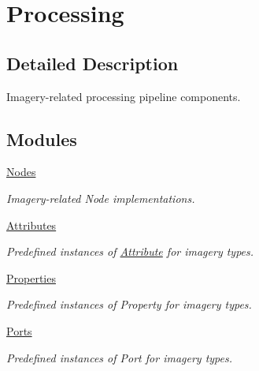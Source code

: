 \hypertarget{group___imagery_process}{}\section{Processing}
\label{group___imagery_process}


\subsection{Detailed Description}
Imagery-\/related processing pipeline components. 

\subsection*{Modules}
\begin{DoxyCompactItemize}
\item 
\hyperlink{group___imagery_nodes}{Nodes}
\begin{DoxyCompactList}\small\item\em Imagery-\/related Node implementations. \end{DoxyCompactList}\item 
\hyperlink{group___imagery_attributes}{Attributes}
\begin{DoxyCompactList}\small\item\em Predefined instances of \hyperlink{classdg_1_1deepcore_1_1_attribute}{Attribute} for imagery types. \end{DoxyCompactList}\item 
\hyperlink{group___imagery_properties}{Properties}
\begin{DoxyCompactList}\small\item\em Predefined instances of Property for imagery types. \end{DoxyCompactList}\item 
\hyperlink{group___imagery_ports}{Ports}
\begin{DoxyCompactList}\small\item\em Predefined instances of Port for imagery types. \end{DoxyCompactList}\end{DoxyCompactItemize}
